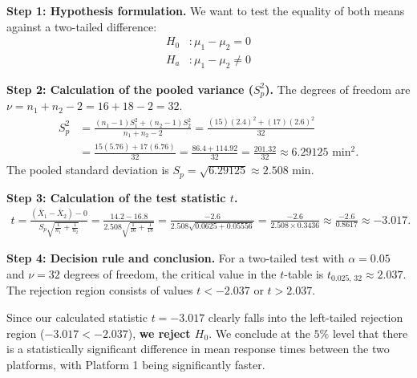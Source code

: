 \begin{solproblema}
	\textbf{Step 1: Hypothesis formulation.}
	We want to test the equality of both means against a two-tailed difference:
	\begin{align}
		H_0&: \mu_1 - \mu_2 = 0 \\
		H_a&: \mu_1 - \mu_2 \neq 0
	\end{align}
	
	\textbf{Step 2: Calculation of the pooled variance ($S_p^2$).}
	The degrees of freedom are $\nu = n_1 + n_2 - 2 = 16 + 18 - 2 = 32$.
	\begin{align}
		S_p^2 &= \frac{(n_1 - 1)S_1^2 + (n_2 - 1)S_2^2}{n_1 + n_2 - 2} = \frac{(15)(2.4)^2 + (17)(2.6)^2}{32} \\
		&= \frac{15(5.76) + 17(6.76)}{32} = \frac{86.4 + 114.92}{32} = \frac{201.32}{32} \approx 6.29125 \text{ min}^2.
	\end{align}
	The pooled standard deviation is $S_p = \sqrt{6.29125} \approx 2.508$ min.
	
	\textbf{Step 3: Calculation of the test statistic $t$.}
	\begin{align}
		t = \frac{(\bar{X}_1 - \bar{X}_2) - 0}{S_p \sqrt{\frac{1}{n_1} + \frac{1}{n_2}}} = \frac{14.2 - 16.8}{2.508 \sqrt{\frac{1}{16} + \frac{1}{18}}} = \frac{-2.6}{2.508 \sqrt{0.0625 + 0.05556}} = \frac{-2.6}{2.508 \times 0.3436} \approx \frac{-2.6}{0.8617} \approx -3.017.
	\end{align}
	
	\textbf{Step 4: Decision rule and conclusion.}
	For a two-tailed test with $\alpha = 0.05$ and $\nu = 32$ degrees of freedom, the critical value in the $t$-table is $t_{0.025, \, 32} \approx 2.037$.
	The rejection region consists of values $t < -2.037$ or $t > 2.037$.
	
	Since our calculated statistic $t = -3.017$ clearly falls into the left-tailed rejection region ($-3.017 < -2.037$), \textbf{we reject $H_0$}. We conclude at the $5\%$ level that there is a statistically significant difference in mean response times between the two platforms, with Platform 1 being significantly faster.
\end{solproblema}

